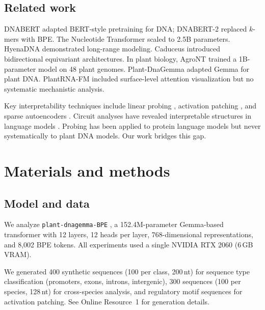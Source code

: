 \documentclass[12pt]{article}
\begin{document}
\subsection{Related work}

DNABERT \citep{ji2021dnabert} adapted BERT-style pretraining for DNA; DNABERT-2 \citep{zhou2023dnabert2} replaced $k$-mers with BPE. The Nucleotide Transformer \citep{dalla2023nucleotide} scaled to 2.5B parameters. HyenaDNA \citep{nguyen2024hyenadna} demonstrated long-range modeling. Caduceus \citep{schiff2024caduceus} introduced bidirectional equivariant architectures. In plant biology, AgroNT \citep{mendoza2024agront} trained a 1B-parameter model on 48 plant genomes. Plant-DnaGemma \citep{zhang2024plantdnagemma} adapted Gemma for plant DNA. PlantRNA-FM \citep{yu2024plantrna} included surface-level attention visualization but no systematic mechanistic analysis.

Key interpretability techniques include linear probing \citep{alain2017understanding, belinkov2017neural, hewitt2019structural}, activation patching \citep{vig2020investigating, meng2022locating}, and sparse autoencoders \citep{cunningham2023sparse, bricken2023monosemanticity, templeton2024scaling}. Circuit analyses have revealed interpretable structures in language models \citep{olsson2022context, wang2023interpretability, geva2023dissecting}. Probing has been applied to protein language models \citep{vig2021bertology, rao2019evaluating, rives2021biological} but never systematically to plant DNA models. Our work bridges this gap.

\section{Materials and methods}

\subsection{Model and data}

We analyze \texttt{plant-dnagemma-BPE} \citep{zhang2024plantdnagemma}, a 152.4M-parameter Gemma-based transformer \citep{team2024gemma} with 12 layers, 12 heads per layer, 768-dimensional representations, and 8,002 BPE tokens. All experiments used a single NVIDIA RTX 2060 (6\,GB VRAM).

We generated 400 synthetic sequences (100 per class, 200\,nt) for sequence type classification (promoters, exons, introns, intergenic), 300 sequences (100 per species, 128\,nt) for cross-species analysis, and regulatory motif sequences for activation patching. See Online Resource~1 for generation details.
\end{document}

